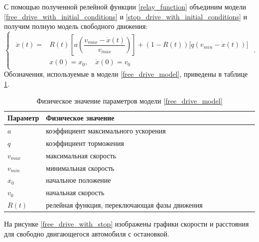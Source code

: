 \documentclass[12pt, a4paper]{extarticle}
\numberwithin{equation}{section}
\begin{document}
С помощью полученной релейной функции \eqref{relay_function} объединим модели \eqref{free_drive_with_initial_conditions} и  \eqref{stop_drive_with_initial_conditions} и получим полную модель свободного движения:
\begin{equation} \label{free_drive_model}
\begin{cases}
\begin{split}
\ddot{x}(t) = &R(t) \left[ a\left(\dfrac{v_{max}-\dot{x}(t)}{v_{max}} \right)\right] + (1-R(t)) \bigg[ q\left( v_{min} - \dot{x}(t)\right) \bigg]  \\
&x(0)=x_0, \quad \dot{x}(0)=v_{0}
\end{split}
\end{cases}.
\end{equation}
Обозначения, используемые в модели \eqref{free_drive_model}, приведены в таблице \ref{free_drive_parameters}.
\begin{table}[h!]
	\caption{Физическое значение параметров модели \eqref{free_drive_model}}
	\label{free_drive_parameters}
	\begin{center}
		\begin{tabularx}{\textwidth}{p{0.15\linewidth}p{0.85\linewidth}}			
			\hline
			\rule{0cm}{0,5cm}
			Параметр &  Физическое значение \\ 
			[3pt]\hline
			$a$ & коэффициент максимального ускорения\\
			$q$ & коэффициент торможения\\ 
			$v_{max}$ & максимальная скорость\\
			$v_{min}$ & минимальная скорость\\ 
			$x_0$ & начальное положение\\
			$v_0$ & начальная скорость\\ 
			$R(t)$ & релейная функция, переключающая фазы движения  \\ 
			\hline
		\end{tabularx}
	\end{center}
\end{table}

На рисунке \eqref{free_drive_with_stop} изображены графики скорости и расстояния для свободно двигающегося автомобиля с остановкой.
\end{document}
